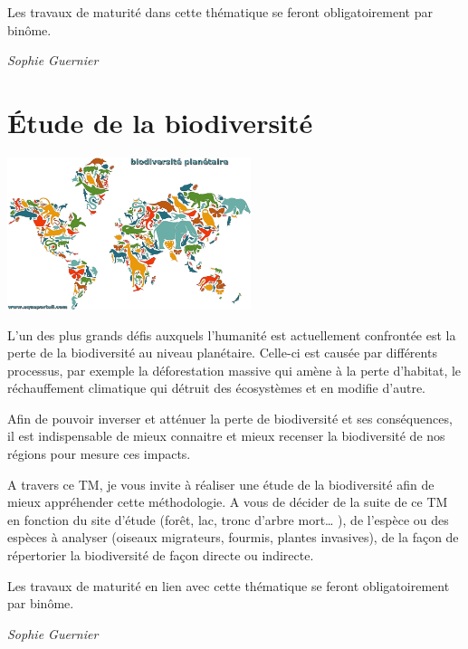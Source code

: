 \documentclass[
  10pt,
  french,
  a5paper,
  openany]{book}
\newenvironment{signature}{\begin{flushright}}{\end{flushright}}
\begin{document}
Les travaux de maturité dans cette thématique se feront obligatoirement par binôme.

\begin{signature}
\emph{Sophie Guernier}

\end{signature}

\hypertarget{uxe9tude-de-la-biodiversituxe9}{%
\chapter{Étude de la biodiversité}\label{uxe9tude-de-la-biodiversituxe9}}

\begin{center}
\includegraphics[width=\textwidth,height=12em]{images/etude-de-la-biodiversite.png}

\end{center}

L'un des plus grands défis auxquels l'humanité est actuellement confrontée est la perte de la biodiversité au niveau planétaire. Celle-ci est causée par différents processus, par exemple la déforestation massive qui amène à la perte d'habitat, le réchauffement climatique qui détruit des écosystèmes et en modifie d'autre.

Afin de pouvoir inverser et atténuer la perte de biodiversité et ses conséquences, il est indispensable de mieux connaitre et mieux recenser la biodiversité de nos régions pour mesure ces impacts.

A travers ce TM, je vous invite à réaliser une étude de la biodiversité afin de mieux appréhender cette méthodologie. A vous de décider de la suite de ce TM en fonction du site d'étude (forêt, lac, tronc d'arbre mort\ldots{} ), de l'espèce ou des espèces à analyser (oiseaux migrateurs, fourmis, plantes invasives), de la façon de répertorier la biodiversité de façon directe ou indirecte.

Les travaux de maturité en lien avec cette thématique se feront obligatoirement par binôme.

\begin{signature}
\emph{Sophie Guernier}

\end{signature}
\end{document}
